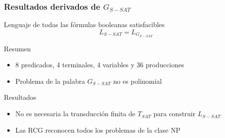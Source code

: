 \documentclass{beamer}
\begin{document}
\begin{frame}
    \frametitle{Resultados derivados de $G_{S-SAT}$}
    
    \begin{block}{Lenguaje de todas las fórmulas booleanas satisfacibles}
        $$L_{S-SAT} = L_{G_{S-SAT}}$$
    \end{block}
    \pause
    \begin{block}{Resumen}
        \begin{itemize}
            \item 8 predicados, 4 terminales, 4 variables y 36 producciones
                  \pause
            \item Problema de la palabra $G_{S-SAT}$ no es polinomial
        \end{itemize}
    \end{block}
    \pause
    \begin{block}{Resultados}
        \begin{itemize}
            \item No es necesaria la transducción finita de $T_{SAT}$ para construir $L_{S-SAT}$
                  \pause       
            \item Las RCG reconocen todos los problemas de la clase NP
        \end{itemize}
    \end{block}
    
\end{frame}
\end{document}
